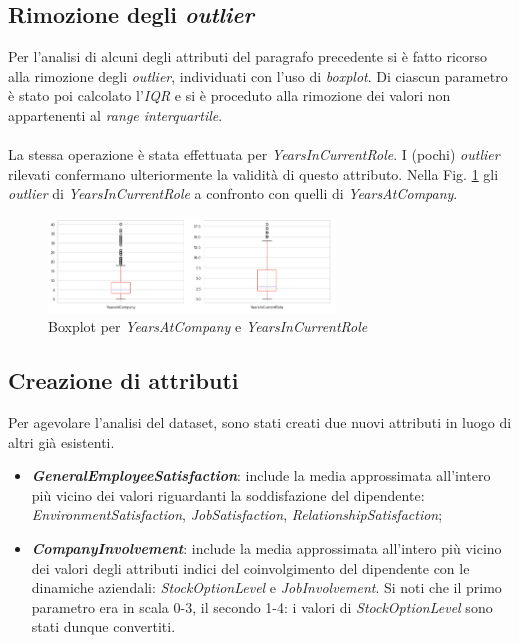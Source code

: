 \subsection{Rimozione degli \textit{outlier}}
Per l’analisi di alcuni degli attributi del paragrafo precedente si è fatto ricorso alla rimozione degli \textit{outlier}, individuati con l’uso di \textit{boxplot}. Di ciascun parametro è stato poi calcolato l’\textit{IQR} e si è proceduto alla rimozione dei valori non appartenenti al \textit{range interquartile}.\\\\
La stessa operazione è stata effettuata per \textit{YearsInCurrentRole}. I (pochi) \textit{outlier} rilevati confermano ulteriormente la validità di questo attributo. Nella Fig. \ref{boxplotOutliers} gli \textit{outlier} di \textit{YearsInCurrentRole} a confronto con quelli di \textit{YearsAtCompany}.
\vspace{2em}
\begin{figure}[H]
    \centering
    \small
    \includegraphics[width=0.68\textwidth]{Immagini/boxplot.png}
    \caption{Boxplot per \textit{YearsAtCompany} e \textit{YearsInCurrentRole}}
    \label{boxplotOutliers}
\end{figure}
\subsection{Creazione di attributi}
Per agevolare l’analisi del dataset, sono stati creati due nuovi attributi in luogo di altri già esistenti.
\begin{itemize}
\itemsep0em
    \item \textit{\textbf{GeneralEmployeeSatisfaction}}: include la media approssimata all’intero più vicino dei valori riguardanti la soddisfazione del dipendente: \textit{EnvironmentSatisfaction}, \textit{JobSatisfaction}, \textit{RelationshipSatisfaction};
    \item \textbf{\textit{CompanyInvolvement}}: include la media approssimata all’intero più vicino dei valori degli attributi indici del coinvolgimento del dipendente con le dinamiche aziendali: \textit{StockOptionLevel} e \textit{JobInvolvement}. Si noti che il primo parametro era in scala 0-3, il secondo 1-4: i valori di \textit{StockOptionLevel} sono stati dunque convertiti.
\end{itemize}

